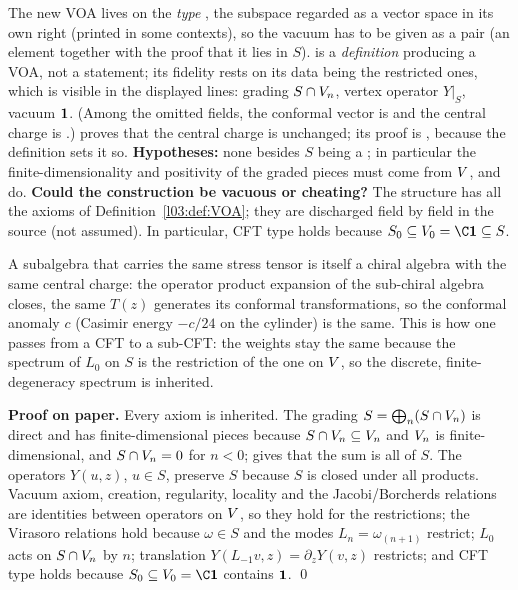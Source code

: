 \begin{dictionary}
The new VOA lives on the \emph{type} , the subspace regarded as a vector space in its own right
(printed  in some contexts), so the vacuum has to be given as a pair
 (an element together with the proof that it lies in $S$).  is a
\emph{definition} producing a VOA, not a statement; its fidelity rests on its data being the restricted ones, which is
visible in the displayed lines: grading $S\cap V_n$, vertex operator $Y|_S$, vacuum $\mathbf{1}$. (Among the omitted fields,
the conformal vector is  and the central charge is .)  proves that the central charge is unchanged; its proof is
, because the definition sets it so. \textbf{Hypotheses:} none besides $S$ being a ; in particular
the finite-dimensionality and positivity of the graded pieces must come from $V$, and do. \textbf{Could the
construction be vacuous or cheating?} The structure  has all the axioms of
Definition~\ref{l03:def:VOA}; they are discharged field by field in the source (not assumed). In particular, CFT type
holds because $S_0\subseteq\lfourV_0 = \C\lfourvac\subseteq S$.
\end{dictionary}

\begin{physics}
A subalgebra that carries the same stress tensor is itself a chiral algebra with the same central charge: the
operator product expansion of the sub-chiral algebra closes, the same $T(z)$ generates its conformal transformations,
so the conformal anomaly $c$ (Casimir energy $-c/24$ on the cylinder) is the same. This is how one passes from a CFT to
a sub-CFT: the weights stay the same because the spectrum of $L_0$ on $S$ is the restriction of the one on $V$, so the
discrete, finite-degeneracy spectrum is inherited.
\end{physics}

\textbf{Proof on paper.} Every axiom is inherited. The grading $S=\bigoplus_n(S\cap V_n)$ is direct and has finite-dimensional
pieces because $S\cap V_n\subseteq V_n$ and $V_n$ is finite-dimensional, and $S\cap V_n = 0$ for $n<0$;
 gives that the sum is all of $S$. The operators $Y(u,z)$, $u\in S$, preserve $S$ because $S$ is closed under all
products. Vacuum axiom, creation, regularity, locality and the Jacobi/Borcherds relations are identities between
operators on $V$, so they hold for the restrictions; the Virasoro relations hold because $\omega\in S$ and the modes
$L_n = \omega_{(n+1)}$ restrict; $L_0$ acts on $S\cap V_n$ by $n$; translation $Y(L_{-1}v,z) = \partial_zY(v,z)$ restricts;
and CFT type holds because $S_0\subseteq\lfourV_0 = \C\lfourvac$ contains $\mathbf{1}$. \qed

